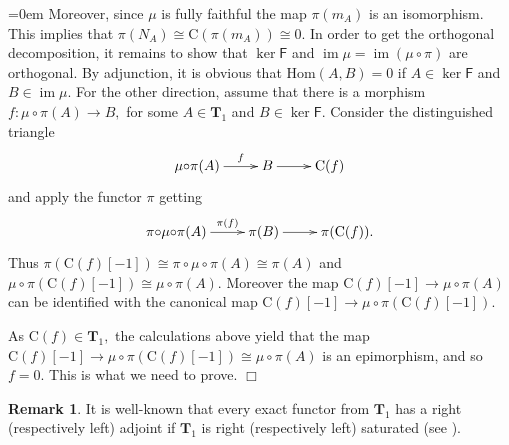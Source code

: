 \documentclass[a4paper,11pt,twoside]{amsart}
\numberwithin{equation}{section}
\theoremstyle{definition}
\newtheorem{remark}[thm]{Remark}
\renewenvironment{proof}{\par\vspace{-5pt}\par\noindent\begingroup\leftskip=0em\hspace{0em}{\bf Proof.}}{\endgroup\hfill$\Box$}
\begin{document}
\begin{proof}
Moreover, since $\mu$ is fully faithful the map
$\pi(m_A)$ is an isomorphism.
This implies that $\pi(N_A){\cong}{\mathrm{C}({\pi(m_A)})}{\cong} 0.$
In order to get the orthogonal decomposition, it remains to show that $\ker{\mathsf{{F}}}$ and $\operatorname{im}\mu=\operatorname{im}(\mu{\circ}\pi)$ are orthogonal. By adjunction, it is obvious that ${\mathrm{Hom}}(A,B)=0$ if $A\in\ker{\mathsf{{F}}}$ and $B\in\operatorname{im}\mu.$ For the other direction, assume that there is a morphism $f\colon\mu{\circ}\pi(A)\to B,$ for some $A\in{{\mathbf{{T}}}}_1$ and $B\in\ker{\mathsf{{F}}}.$ Consider the distinguished triangle
\[
\xymatrix{
\mu{\circ}\pi(A)\ar[r]^-{f}& B\ar[r]&{\mathrm{C}({f})}
}
\]
and apply the functor $\pi$ getting
\[
\xymatrix{
\pi{\circ}\mu{\circ}\pi(A)\ar[r]^-{\pi(f)}& \pi(B)\ar[r]&\pi({\mathrm{C}({f})}).
}
\]
Thus $\pi({{{\mathrm{C}({f})}}[-1]}){\cong}\pi{\circ}\mu{\circ}\pi(A){\cong}\pi(A)$ and
$\mu{\circ}\pi({{{\mathrm{C}({f})}}[-1]}){\cong}\mu{\circ}\pi(A).$ Moreover the map
${{{\mathrm{C}({f})}}[-1]}\to\mu{\circ}\pi(A)$ can be identified with the canonical map ${{{\mathrm{C}({f})}}[-1]}\to\mu{\circ}\pi({{{\mathrm{C}({f})}}[-1]}).$

As ${\mathrm{C}({f})}\in{{\mathbf{{T}}}}_1,$ the calculations above yield that the map
${{{\mathrm{C}({f})}}[-1]}\to\mu{\circ}\pi({{{\mathrm{C}({f})}}[-1]}){\cong}\mu{\circ}\pi(A)$
is an epimorphism, and so $f=0.$ This is what we need to prove.
\end{proof}

\begin{remark}\label{rmk:sat}
It is well-known that every exact functor from ${{\mathbf{{T}}}}_1$ has a right (respectively left) adjoint if ${{\mathbf{{T}}}}_1$ is right (respectively left) saturated (see \cite{BB}).
\end{remark}
\end{document}
